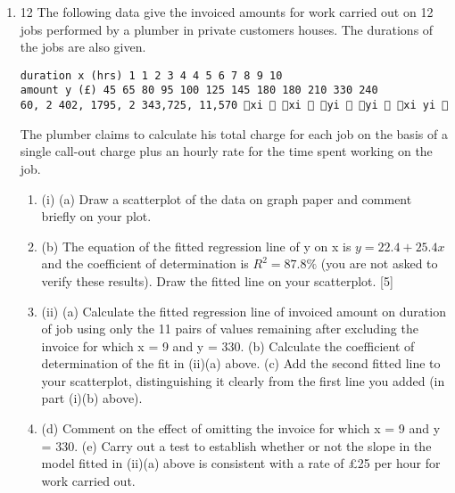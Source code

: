 \documentclass[a4paper,12pt]{article}
\begin{document}
\begin{enumerate}
\item 12 The following data give the invoiced amounts for work carried out on 12 jobs
performed by a plumber in private customers houses. The durations of the jobs are
also given.
\begin{verbatim}
duration x (hrs) 1 1 2 3 4 4 5 6 7 8 9 10
amount y (£) 45 65 80 95 100 125 145 180 180 210 330 240
60, 2 402, 1795, 2 343,725, 11,570 xi  xi  yi  yi  xi yi     
\end{verbatim}

The plumber claims to calculate his total charge for each job on the basis of a single call-out charge plus an hourly rate for the time spent working on the job.
\begin{enumerate}
    \item (i) (a) Draw a scatterplot of the data on graph paper and comment briefly on your plot.
\item (b) The equation of the fitted regression line of y on x is $y = 22.4 + 25.4x$ and the coefficient of determination is $R^2 = 87.8\%$ (you are not asked
to verify these results).
Draw the fitted line on your scatterplot. [5]
\item (ii) (a) Calculate the fitted regression line of invoiced amount on duration of job using only the 11 pairs of values remaining after excluding the
invoice for which x = 9 and y = 330.
(b) Calculate the coefficient of determination of the fit in (ii)(a) above.
(c) Add the second fitted line to your scatterplot, distinguishing it clearly from the first line you added (in part (i)(b) above).
\item (d) Comment on the effect of omitting the invoice for which x = 9 and y = 330.
(e) Carry out a test to establish whether or not the slope in the model fitted in (ii)(a) above is consistent with a rate of £25 per hour for work
carried out.
\end{enumerate}


\end{enumerate}
\end{document}
